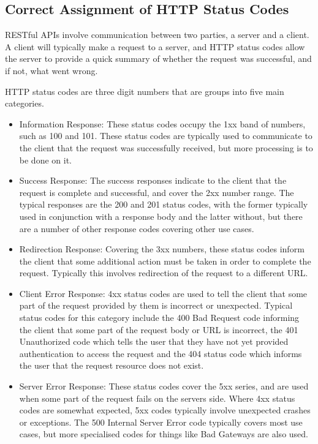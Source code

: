 \subsection{Correct Assignment of HTTP Status Codes}
RESTful APIs involve communication between two parties, a server and a client. A client will typically make a request to a server, and HTTP status codes allow the server to provide a quick summary of whether the request was successful, and if not, what went wrong.

HTTP status codes are three digit numbers that are groups into five main categories.
\begin{itemize}
    \item Information Response: These status codes occupy the 1xx band of numbers, such as 100 and 101. These status codes are typically used to communicate to the client that the request was successfully received, but more processing is to be done on it.
    \item Success Response: The success responses indicate to the client that the request is complete and successful, and cover the 2xx number range. The typical responses are the 200 and 201 status codes, with the former typically used in conjunction with a response body and the latter without, but there are a number of other response codes covering other use cases.
    \item Redirection Response: Covering the 3xx numbers, these status codes inform the client that some additional action must be taken in order to complete the request. Typically this involves redirection of the request to a different URL.
    \item Client Error Response: 4xx status codes are used to tell the client that some part of the request provided by them is incorrect or unexpected. Typical status codes for this category include the 400 Bad Request code informing the client that some part of the request body or URL is incorrect, the 401 Unauthorized code which tells the user that they have not yet provided authentication to access the request and the 404 status code which informs the user that the request resource does not exist.
    \item Server Error Response: These status codes cover the 5xx series, and are used when some part of the request fails on the servers side. Where 4xx status codes are somewhat expected, 5xx codes typically involve unexpected crashes or exceptions. The 500 Internal Server Error code typically covers most use cases, but more specialised codes for things like Bad Gateways are also used. 
\end{itemize}

